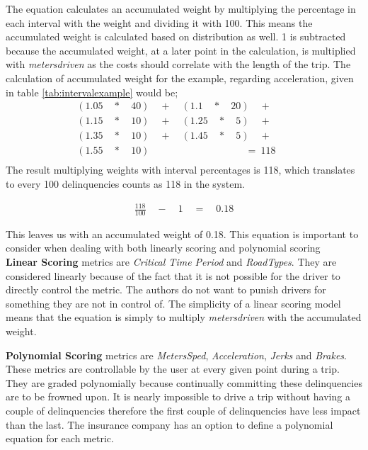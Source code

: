 The equation calculates an accumulated weight by multiplying the percentage in each interval with the weight and dividing it with 100. This means the accumulated weight is calculated based on distribution as well. 1 is subtracted because the accumulated weight, at a later point in the calculation, is multiplied with \textit{metersdriven} as the costs should correlate with the length of the trip. The calculation of accumulated weight for the example, regarding acceleration, given in table \ref{tab:intervalexample} would be;
\begin{align*}
(1.05\quad *\quad 40)\quad +\quad (1.1\quad *\quad 20)\quad +\quad \quad \\ 
  (1.15\quad *\quad 10)\quad +\quad (1.25\quad *\quad 5)\quad +\quad \quad \\
  (1.35\quad *\quad 10)\quad +\quad (1.45\quad *\quad 5)\quad +\quad \quad \\
  (1.55\quad *\quad 10)\quad \quad \quad \quad \quad \quad \quad \quad \ \ \ \quad =\ 118 \\
\end{align*}
The result multiplying weights with interval percentages is 118, which translates to every 100 delinquencies counts as 118 in the system.

\begin{align*}
\frac { 118 }{ 100 } \quad -\quad 1\quad =\quad 0.18
\end{align*}


This leaves us with an accumulated weight of 0.18. This equation is important to consider when dealing with both linearly scoring and polynomial scoring\\

\textbf{Linear Scoring} metrics are \textit{Critical Time Period} and \textit{RoadTypes}. They are considered linearly because of the fact that it is not possible for the driver to directly control the metric. The authors do not want to punish drivers for something they are not in control of. 
The simplicity of a linear scoring model means that the equation is simply to multiply \textit{metersdriven} with the accumulated weight.

\textbf{Polynomial Scoring} metrics are \textit{MetersSped}, \textit{Acceleration}, \textit{Jerks} and \textit{Brakes}. These metrics are controllable by the user at every given point during a trip. They are graded polynomially because continually committing these delinquencies are to be frowned upon. It is nearly impossible to drive a trip without having a couple of delinquencies therefore the first couple of delinquencies have less impact than the last. The insurance company has an option to define a polynomial equation for each metric.

